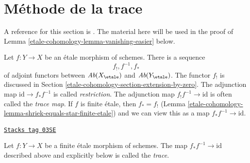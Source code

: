 \section{M\'ethode de la trace}
\label{etale-cohomology-section-trace-method}
A reference for this section is \cite[Expos\'e IX, \S 5]{SGA4}.
The material here will be used in the proof of
Lemma \ref{etale-cohomology-lemma-vanishing-easier} below.

\medskip\noindent
Let $f : Y \to X$ be an \'etale morphism of schemes. There
is a sequence
$$
f_!, f^{-1}, f_*
$$
of adjoint functors between
$\textit{Ab}(X_\etale)$ and $\textit{Ab}(Y_\etale)$.
The functor $f_!$ is discussed in Section \ref{etale-cohomology-section-extension-by-zero}.
The adjunction map $\text{id} \to f_* f^{-1}$ is called {\it restriction}.
The adjunction map $f_! f^{-1} \to \text{id}$ is often
called the {\it trace map}. If $f$ is finite \'etale, then $f_* = f_!$
(Lemma \ref{etale-cohomology-lemma-shriek-equals-star-finite-etale}) and
we can view this as a map $f_*f^{-1} \to \text{id}$.

\begin{definition}
\label{etale-cohomology-definition-trace-map}
\href{https://stacks.math.columbia.edu/tag/03SE}{\texttt{Stacks tag 03SE}}

Let $f : Y \to X$ be a finite \'etale morphism of schemes.
The map $f_* f^{-1} \to \text{id}$ described above and explicitly below
is called the {\it trace}.
\end{definition}


